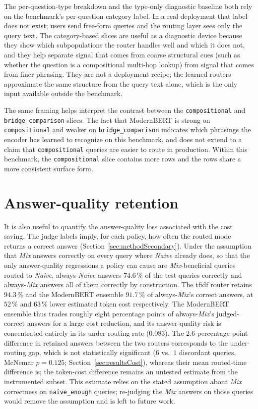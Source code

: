 \documentclass[english, bibtex]{kththesis}               %
\numberwithin{listing}{chapter}
\begin{document}
The per-question-type breakdown and the type-only diagnostic baseline both rely on the benchmark's per-question category label. In a real deployment that label does not exist; users send free-form queries and the routing layer sees only the query text. The category-based slices are useful as a diagnostic device because they show which subpopulations the router handles well and which it does not, and they help separate signal that comes from coarse structural cues (such as whether the question is a compositional multi-hop lookup) from signal that comes from finer phrasing. They are not a deployment recipe; the learned routers approximate the same structure from the query text alone, which is the only input available outside the benchmark.

The same framing helps interpret the contrast between the \texttt{compositional} and \texttt{bridge\_comparison} slices. The fact that ModernBERT is strong on \texttt{compositional} and weaker on \texttt{bridge\_comparison} indicates which phrasings the encoder has learned to recognize on this benchmark, and does not extend to a claim that \texttt{compositional} queries are easier to route in production. Within this benchmark, the \texttt{compositional} slice contains more rows and the rows share a more consistent surface form.

\section{Answer-quality retention}
\label{sec:resultsRetention}

It is also useful to quantify the answer-quality loss associated with the cost saving. The judge labels imply, for each policy, how often the routed mode returns a correct answer (Section~\ref{sec:methodSecondary}). Under the assumption that \emph{Mix} answers correctly on every query where \emph{Naive} already does, so that the only answer-quality regressions a policy can cause are \emph{Mix}-beneficial queries routed to \emph{Naive}, always-\emph{Naive} answers $74.6\,\%$ of the test queries correctly and always-\emph{Mix} answers all of them correctly by construction. The \gls{tfidf} router retains $94.3\,\%$ and the ModernBERT ensemble $91.7\,\%$ of always-\emph{Mix}'s correct answers, at $52\,\%$ and $63\,\%$ lower estimated token cost respectively. The ModernBERT ensemble thus trades roughly eight percentage points of always-\emph{Mix}'s judged-correct answers for a large cost reduction, and its answer-quality risk is concentrated entirely in its under-routing rate ($0.083$). The $2.6$-percentage-point difference in retained answers between the two routers corresponds to the under-routing gap, which is not statistically significant ($6$ vs.\ $1$ discordant queries, McNemar $p = 0.125$; Section~\ref{sec:resultsCost}), whereas their mean routed-time difference is; the token-cost difference remains an untested estimate from the instrumented subset. This estimate relies on the stated assumption about \emph{Mix} correctness on \texttt{naive\_enough} queries; re-judging the \emph{Mix} answers on those queries would remove the assumption and is left to future work.
\end{document}
